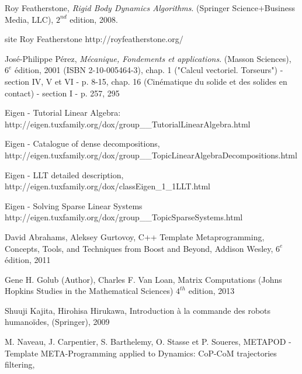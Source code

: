 
\begin{thebibliography}{9}

  Roy Featherstone,
  \emph{Rigid Body Dynamics Algorithms}.
  (Springer Science+Business Media, LLC),
  $2^{nd}$ edition,
  2008.

  site Roy Featherstone
  http://royfeatherstone.org/

  
  José-Philippe Pérez,
  \emph{Mécanique, Fondements et applications}.
  (Masson Sciences),
  $6^{e}$ édition, 2001 (ISBN 2-10-005464-3),
  chap. 1 ("Calcul vectoriel. Torseurs") - section IV, V et VI - p. 8-15, 
  chap. 16 (Cinématique du solide et des solides en contact) - section I - p. 257, 295
  
  Eigen - Tutorial Linear Algebra:
  http://eigen.tuxfamily.org/dox/group\_\_TutorialLinearAlgebra.html
  
  Eigen - Catalogue of dense decompositions,
  http://eigen.tuxfamily.org/dox/group\_\_TopicLinearAlgebraDecompositions.html
  
  Eigen - LLT detailed description,
  http://eigen.tuxfamily.org/dox/classEigen\_1\_1LLT.html

  Eigen - Solving Sparse Linear Systems
  http://eigen.tuxfamily.org/dox/group\_\_TopicSparseSystems.html

  David Abrahams, Aleksey Gurtovoy,
  C++ Template Metaprogramming,
  Concepts, Tools, and Techniques from Boost and Beyond,
  Addison Wesley,
  $6^e$ édition, 2011

  Gene H. Golub (Author), Charles F. Van Loan,
  Matrix Computations (Johns Hopkins Studies in the Mathematical Sciences)
  $4^{th}$ edition, 2013
  
  Shuuji Kajita, Hirohisa Hirukawa,
  Introduction à la commande des robots humanoïdes,
  (Springer),
  2009
  
  M. Naveau, J. Carpentier, S. Barthelemy, O. Stasse et P. Soueres,
  METAPOD - Template META-Programming applied to Dynamics: CoP-CoM trajectories filtering,
  

\end{thebibliography}
